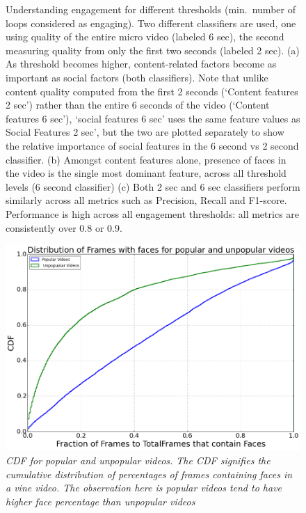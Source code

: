 \begin{figure}[htp]
    \caption{ Understanding engagement for different thresholds (min.\ number of loops considered as engaging). Two different classifiers are used, one using quality of the entire micro video (labeled 6 sec), the second measuring quality from only the first two seconds (labeled 2 sec). (a) As threshold becomes higher, content-related factors become as important as social factors (both classifiers). Note that unlike content quality computed from the first 2 seconds (`Content features 2 sec') rather than the entire 6 seconds of the video (`Content features 6 sec'), `social features 6 sec' uses the same feature values as Social Features 2 sec', but the two are plotted separately to show the relative  importance of social features in the 6 second vs 2 second classifier. (b) Amongst content features alone, presence of faces in the video is the single most dominant feature, across all threshold levels (6 second classifier) (c) Both 2 sec and 6 sec classifiers perform similarly across all metrics such as Precision, Recall and F1-score. Performance is high across all engagement thresholds: all metrics are consistently over 0.8 or 0.9.}
    \label{fig:classifier}
\end{figure}




\begin{figure}[!htb]
    \centering
    \includegraphics[width=0.6\columnwidth]{FaceCDF}
    \caption{\textsl{ CDF for popular and unpopular videos. The CDF signifies the cumulative distribution of percentages of frames containing faces in a vine video. The observation here is popular videos tend to have higher face percentage than unpopular videos}}
    \label{fig:Face_CDF}
\end{figure}


